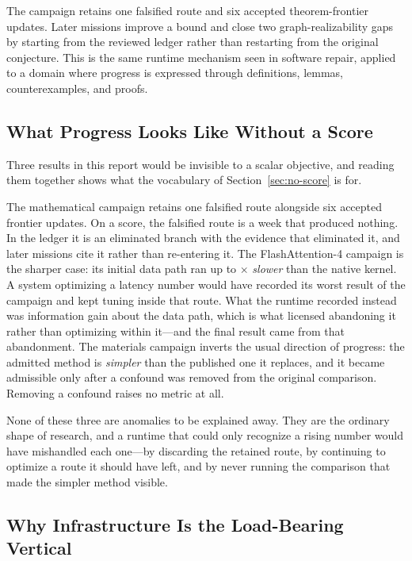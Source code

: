 The campaign retains one falsified route and six accepted theorem-frontier updates.
Later missions improve a bound and close two graph-realizability gaps by starting
from the reviewed ledger rather than restarting from the original conjecture. This
is the same runtime mechanism seen in software repair, applied to a domain where
progress is expressed through definitions, lemmas, counterexamples, and proofs.

\subsection{What Progress Looks Like Without a Score}

Three results in this report would be invisible to a scalar objective, and reading
them together shows what the vocabulary of Section~\ref{sec:no-score} is for.

The mathematical campaign retains one falsified route alongside six accepted
frontier updates. On a score, the falsified route is a week that produced nothing.
In the ledger it is an eliminated branch with the evidence that eliminated it, and
later missions cite it rather than re-entering it. The FlashAttention-4 campaign is
the sharper case: its initial data path ran up to \FlashDAWorstRoute$\times$
\emph{slower} than the native kernel. A system optimizing a latency number would have
recorded its worst result of the campaign and kept tuning inside that route. What the
runtime recorded instead was information gain about the data path, which is what
licensed abandoning it rather than optimizing within it---and the final result came
from that abandonment. The materials campaign inverts the usual direction of
progress: the admitted method is \emph{simpler} than the published one it replaces,
and it became admissible only after a confound was removed from the original
comparison. Removing a confound raises no metric at all.

None of these three are anomalies to be explained away. They are the ordinary shape
of research, and a runtime that could only recognize a rising number would have
mishandled each one---by discarding the retained route, by continuing to optimize a
route it should have left, and by never running the comparison that made the simpler
method visible.

\subsection{Why Infrastructure Is the Load-Bearing Vertical}

